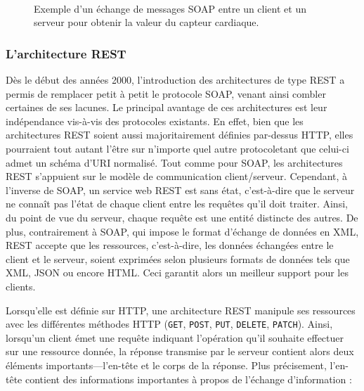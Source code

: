 \begin{figure}[H]
  \centering
{}
  \\[20pt]
  \caption{Exemple d'un échange de messages \acs{SOAP} entre un client et un serveur pour obtenir la valeur du capteur cardiaque.}
  \label{fig:soap_msg}
\end{figure}

\subsubsection{L'architecture \ac{REST}}

Dès le début des années 2000, l'introduction des architectures de type \ac{REST} \citep{Fielding2000} a permis de remplacer petit à petit le protocole \ac{SOAP}, venant ainsi combler certaines de ses lacunes. Le principal avantage de ces architectures est leur indépendance vis-à-vis des protocoles existants. En effet, bien que les architectures \ac{REST} soient aussi majoritairement définies par-dessus \ac{HTTP}, elles pourraient tout autant l'être sur n'importe quel autre protocole\textemdash tant que celui-ci admet un schéma d'\ac{URI} normalisé. Tout comme pour \ac{SOAP}, les architectures \ac{REST} s'appuient sur le modèle de communication client/serveur. Cependant, à l'inverse de \ac{SOAP}, un service web \ac{REST} est sans état, c'est-à-dire que le serveur ne connaît pas l'état de chaque client entre les requêtes qu'il doit traiter. Ainsi, du point de vue du serveur, chaque requête est une entité distincte des autres. De plus, contrairement à \ac{SOAP}, qui impose le format d'échange de données en \ac{XML}, \ac{REST} accepte que les ressources, c'est-à-dire, les données échangées entre le client et le serveur, soient exprimées selon plusieurs formats de données tels que \ac{XML}, \ac{JSON} ou encore \ac{HTML}. Ceci garantit alors un meilleur support pour les clients.

Lorsqu'elle est définie sur \ac{HTTP}, une architecture \ac{REST} manipule ses ressources avec les différentes méthodes \ac{HTTP} (\texttt{GET}, \texttt{POST}, \texttt{PUT}, \texttt{DELETE}, \texttt{PATCH}). Ainsi, lorsqu'un client émet une requête indiquant l'opération qu'il souhaite effectuer sur une ressource donnée, la réponse transmise par le serveur contient alors deux éléments importants—l'en-tête et le corps de la réponse. Plus précisement, l'en-tête contient des informations importantes à propos de l'échange d'information :

